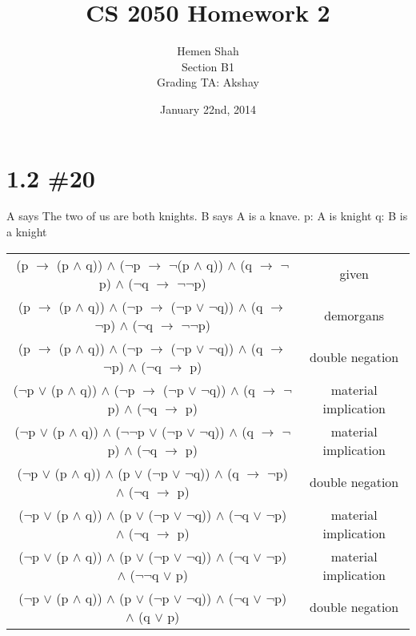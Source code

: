 \documentclass[h]{article}
\title{CS 2050 Homework 2}
\date{January 22nd, 2014}
\author{Hemen Shah \\ Section B1 \\ Grading TA: Akshay}
\begin{document}
\maketitle

\section*{1.2 \#20}

A says The two of us are both knights.\newline
B says A is a knave.\newline
p: A is knight\newline 
q: B is a knight\newline
\begin{tabular}{|c c|}\hline
(p $\rightarrow$ (p $\wedge$ q)) $\wedge$ ($\neg$p $\rightarrow$ $\neg$(p $\wedge$ q)) $\wedge$ (q $\rightarrow$ $\neg$p) $\wedge$ ($\neg$q $\rightarrow$ $\neg \neg$p) & given\\ 
(p $\rightarrow$ (p $\wedge$ q)) $\wedge$ ($\neg$p $\rightarrow$ ($\neg$p $\vee$ $\neg$q)) $\wedge$ (q $\rightarrow$ $\neg$p) $\wedge$ ($\neg$q $\rightarrow$ $\neg \neg$p) & demorgans \\ 
(p $\rightarrow$ (p $\wedge$ q)) $\wedge$ ($\neg$p $\rightarrow$ ($\neg$p $\vee$ $\neg$q)) $\wedge$ (q $\rightarrow$ $\neg$p) $\wedge$ ($\neg$q $\rightarrow$ p) & double negation\\ 
($\neg$p $\vee$ (p $\wedge$ q)) $\wedge$ ($\neg$p $\rightarrow$ ($\neg$p $\vee$ $\neg$q)) $\wedge$ (q $\rightarrow$ $\neg$p) $\wedge$ ($\neg$q $\rightarrow$ p) & material implication\\ 
($\neg$p $\vee$ (p $\wedge$ q)) $\wedge$ ($\neg \neg$p $\vee$ ($\neg$p $\vee$ $\neg$q)) $\wedge$ (q $\rightarrow$ $\neg$p) $\wedge$ ($\neg$q $\rightarrow$ p) & material implication\\ 
($\neg$p $\vee$ (p $\wedge$ q)) $\wedge$ (p $\vee$ ($\neg$p $\vee$ $\neg$q)) $\wedge$ (q $\rightarrow$ $\neg$p) $\wedge$ ($\neg$q $\rightarrow$ p) & double negation\\ 
($\neg$p $\vee$ (p $\wedge$ q)) $\wedge$ (p $\vee$ ($\neg$p $\vee$ $\neg$q)) $\wedge$ ($\neg $q $\vee$ $\neg$p) $\wedge$ ($\neg$q $\rightarrow$ p) & material implication\\ 
($\neg$p $\vee$ (p $\wedge$ q)) $\wedge$ (p $\vee$ ($\neg$p $\vee$ $\neg$q)) $\wedge$ ($\neg $q $\vee$ $\neg$p) $\wedge$ ($\neg \neg$q $\vee$ p) & material implication\\ 
($\neg$p $\vee$ (p $\wedge$ q)) $\wedge$ (p $\vee$ ($\neg$p $\vee$ $\neg$q)) $\wedge$ ($\neg $q $\vee$ $\neg$p) $\wedge$ (q $\vee$ p) & double negation\\

\end{tabular}
\end{document}
